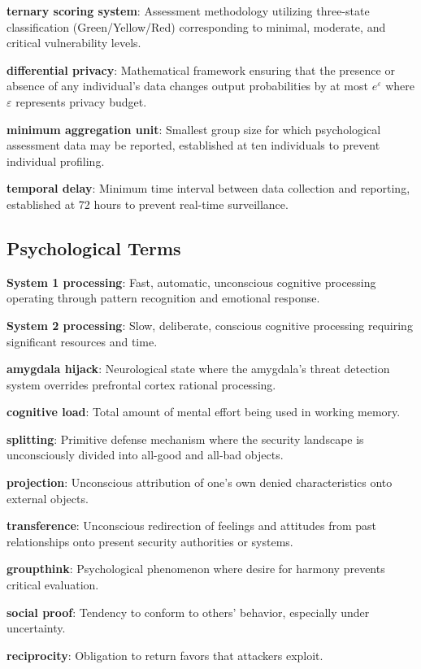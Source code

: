 \documentclass[11pt,a4paper]{article}
\begin{document}
\textbf{ternary scoring system}: Assessment methodology utilizing three-state classification (Green/Yellow/Red) corresponding to minimal, moderate, and critical vulnerability levels.

\textbf{differential privacy}: Mathematical framework ensuring that the presence or absence of any individual's data changes output probabilities by at most $e^\varepsilon$ where $\varepsilon$ represents privacy budget.

\textbf{minimum aggregation unit}: Smallest group size for which psychological assessment data may be reported, established at ten individuals to prevent individual profiling.

\textbf{temporal delay}: Minimum time interval between data collection and reporting, established at 72 hours to prevent real-time surveillance.

\subsection{Psychological Terms}

\textbf{System 1 processing}: Fast, automatic, unconscious cognitive processing operating through pattern recognition and emotional response.

\textbf{System 2 processing}: Slow, deliberate, conscious cognitive processing requiring significant resources and time.

\textbf{amygdala hijack}: Neurological state where the amygdala's threat detection system overrides prefrontal cortex rational processing.

\textbf{cognitive load}: Total amount of mental effort being used in working memory.

\textbf{splitting}: Primitive defense mechanism where the security landscape is unconsciously divided into all-good and all-bad objects.

\textbf{projection}: Unconscious attribution of one's own denied characteristics onto external objects.

\textbf{transference}: Unconscious redirection of feelings and attitudes from past relationships onto present security authorities or systems.

\textbf{groupthink}: Psychological phenomenon where desire for harmony prevents critical evaluation.

\textbf{social proof}: Tendency to conform to others' behavior, especially under uncertainty.

\textbf{reciprocity}: Obligation to return favors that attackers exploit.
\end{document}
